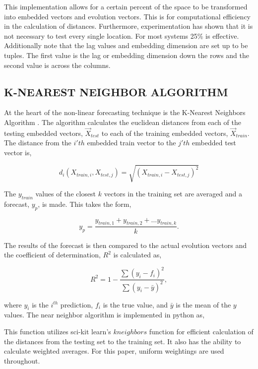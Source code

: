 

This implementation allows for a certain percent of the space to be transformed into embedded vectors and evolution vectors. This is for computational efficiency in the calculation of distances. Furthermore, experimentation has shown that it is not necessary to test every single location. For most systems 25\% is effective. Additionally note that the lag values and embedding dimension are set up to be tuples. The first value is the lag or embedding dimension down the rows and the second value is across the columns. 


\subsection{K-NEAREST NEIGHBOR ALGORITHM}

At the heart of the non-linear forecasting technique is the K-Nearest Neighbors Algorithm \cite{nearest_neighbor}. The algorithm calculates the euclidean distances from each of the testing embedded vectors, $\vec X_{test}$ to each of the training embedded vectors, $\vec X_{train}$. The distance from the $i'th$ embedded train vector to the $j'th$ embedded test vector is,

$$ d_i( X_{train,i}, X_{test,j} ) = \sqrt{ (X_{train,i}-X_{test,j})^2}$$


The $y_{train}$ values of the closest $k$ vectors in the training set are averaged and a forecast, $y_p$, is made. This takes the form,

$$ y_{p} = \frac{ y_{train,1} + y_{train,2} + \dots  y_{train,k} } {k}. $$


The results of the forecast is then compared to the actual evolution vectors and the coefficient of determination, $R^2$ is calculated as,

$$R^2 = 1 - \frac{ \sum(y_i - f_i)^2 }  {\sum(y_i - \bar y )^2},$$

where $y_i$ is the $i^{th}$ prediction, $f_i$ is the true value, and $\bar y$ is the mean of the $y$ values. The near neighbor algorithm is implemented in python as,




This function utilizes sci-kit learn's $kneighbors$ function for efficient calculation of the distances from the testing set to the training set. It also has the ability to calculate weighted averages. For this paper, uniform weightings are used throughout.

